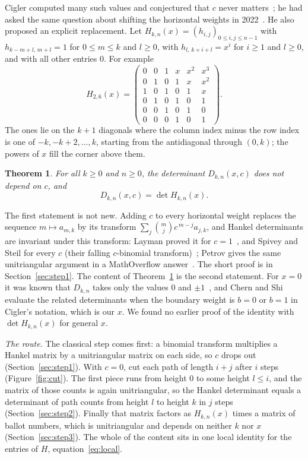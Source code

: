\documentclass[11pt]{amsart}
\newtheorem{thm}{Theorem}
\theoremstyle{definition}
\begin{document}
Cigler computed many such values and conjectured that $c$ never matters~\cite[p.~5]{C23}; he had asked the same question about shifting the horizontal weights in 2022~\cite{MSE}. He also proposed an
explicit replacement. Let $H_{k,n}(x)=(h_{i,j})_{0\le i,j\le n-1}$ with $h_{k-m+l,\,m+l}=1$ for $0\le m\le k$ and
$l\ge0$, with $h_{l,\,k+i+l}=x^i$ for $i\ge1$ and $l\ge0$, and with all other entries $0$. For example
\[
H_{2,6}(x)=\begin{pmatrix}
0&0&1&x&x^2&x^3\\ 0&1&0&1&x&x^2\\ 1&0&1&0&1&x\\ 0&1&0&1&0&1\\ 0&0&1&0&1&0\\ 0&0&0&1&0&1
\end{pmatrix}.
\]
The ones lie on the $k+1$ diagonals where the column index minus the row index is one of $-k,-k+2,\dots,k$, starting
from the antidiagonal through $(0,k)$; the powers of $x$ fill the corner above them.

\begin{thm}\label{thm:main}
For all $k\ge0$ and $n\ge0$, the determinant $D_{k,n}(x,c)$ does not depend on $c$, and
\[
D_{k,n}(x,c)=\det H_{k,n}(x).
\]
\end{thm}

The first statement is not new. Adding $c$ to every horizontal weight replaces the sequence $m\mapsto a_{m,k}$ by its
transform $\sum_j\binom mj c^{\,m-j}a_{j,k}$, and Hankel determinants are invariant under this transform: Layman proved
it for $c=1$~\cite{L01}, and Spivey and Steil for every $c$ (their falling $c$-binomial transform)~\cite[Theorem~6.1]{SS06}; Petrov gives the same unitriangular argument in a MathOverflow answer~\cite{P22}.
The short proof is in Section~\ref{sec:step1}. The content of
Theorem~\ref{thm:main} is the second statement. For $x=0$ it was known that $D_{k,n}$ takes only the values $0$ and
$\pm1$~\cite[p.~5]{C23}, and Chern and Shi~\cite{CS} evaluate the related determinants when the boundary weight is $b=0$
or $b=1$ in Cigler's notation, which is our $x$. We found no earlier proof of the identity with $\det H_{k,n}(x)$ for
general $x$.

\emph{The route.} The classical step comes first: a binomial transform multiplies a Hankel matrix by a unitriangular
matrix on each side, so $c$ drops out (Section~\ref{sec:step1}). With $c=0$, cut each path of length $i+j$ after $i$ steps (Figure~\ref{fig:cut}).
The first piece runs from height $0$ to some height $l\le i$, and the matrix of those counts is again unitriangular, so
the Hankel determinant equals a determinant of path counts from height $l$ to height $k$ in $j$ steps
(Section~\ref{sec:step2}). Finally that matrix factors as $H_{k,n}(x)$ times a matrix of ballot numbers, which is
unitriangular and depends on neither $k$ nor $x$ (Section~\ref{sec:step3}). The whole of the content sits in one local
identity for the entries of $H$, equation~\eqref{eq:local}.
\end{document}
